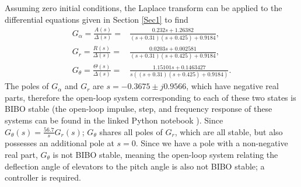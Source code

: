 \documentclass[9pt,a4paper]{article}
\begin{document}
    \noindent Assuming zero initial conditions, the Laplace transform can be applied to the differential equations given in Section \ref{Sec1} to find
    \begin{subequations}
        \begin{align}
            G_\alpha =\frac{A(s)}{\Delta(s)}= & \frac{0.232s + 1.26382}{(s + 0.31)(s + 0.425) + 0.9184}, \\
            G_r =\frac{R(s)}{\Delta(s)}=& \frac{0.0203s + 0.002581}{(s + 0.31)(s + 0.425) + 0.9184}, \\
            G_\theta =\frac{\Theta(s)}{\Delta(s)}=& \frac{1.15101s + 0.1463427}{s((s + 0.31)(s + 0.425) + 0.9184)}.
        \end{align}
    \end{subequations}
    The poles of $G_\alpha$ and $G_r$ are $s=-0.3675 \pm j0.9566$, which have negative real parts, therefore the open-loop system corresponding to each of these two states is BIBO stable (the open-loop impulse, step, and frequency response of these systems can be found in the linked Python notebook \cite{python_notebook}). Since $G_{\theta}(s)=\frac{56.7}{s}G_{r}(s)$; $G_{\theta}$ shares all poles of $G_{r}$, which are all stable, but also possesses an additional pole at $s=0$. Since we have a pole with a non-negative real part, $G_{\theta}$ is not BIBO stable, meaning the open-loop system relating the deflection angle of elevators to the pitch angle is also not BIBO stable; a controller is required.
\end{document}
